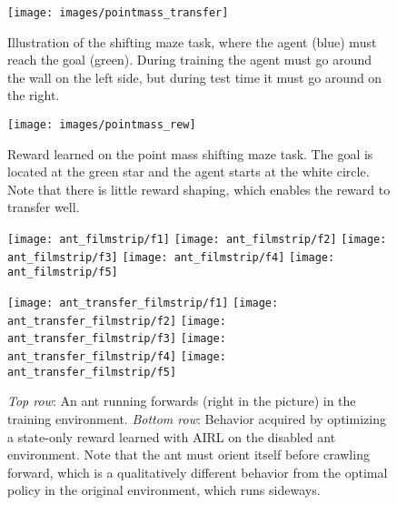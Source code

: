\documentclass{article} \usepackage{iclr2018_conference,times}
\begin{document}
\begin{figure*}[t]
\setlength{\unitlength}{0.99\columnwidth}
    \centering
    \begin{minipage}{.49\textwidth}
\texttt{[image: images/pointmass\_transfer]}
         \vspace{-0.1in}

\caption{
\label{fig:transfer_maze}
Illustration of the shifting maze task, where the agent (blue) must reach the goal (green). During training the agent must go around the wall on the left side, but during test time it must go around on the right.
}
\end{minipage}\hfill
    \begin{minipage}{.49\textwidth}
    \centering
    \texttt{[image: images/pointmass\_rew]}
         \vspace{-0.1in}

\caption{
\label{fig:pointmass_transfer_rew}
Reward learned on the point mass shifting maze task. The goal is located at the green star and the agent starts at the white circle. Note that there is little reward shaping, which enables the reward to transfer well.
}
    \end{minipage}
\end{figure*}

\begin{figure}
\centering
\texttt{[image: ant\_filmstrip/f1]}
\texttt{[image: ant\_filmstrip/f2]}
\texttt{[image: ant\_filmstrip/f3]}
\texttt{[image: ant\_filmstrip/f4]}
\texttt{[image: ant\_filmstrip/f5]}

\texttt{[image: ant\_transfer\_filmstrip/f1]}
\texttt{[image: ant\_transfer\_filmstrip/f2]}
\texttt{[image: ant\_transfer\_filmstrip/f3]}
\texttt{[image: ant\_transfer\_filmstrip/f4]}
\texttt{[image: ant\_transfer\_filmstrip/f5]}

\vspace{-0.1in}
\caption{\label{fig:ant_transfer_filmstrip}
\textit{Top row}: An ant running forwards (right in the picture) in the training environment. \textit{Bottom row}: Behavior acquired by optimizing a state-only reward learned with AIRL on the disabled ant environment. Note that the ant must orient itself before crawling forward, which is a qualitatively different behavior from the optimal policy in the original environment, which runs sideways.}
\end{figure}
\end{document}
